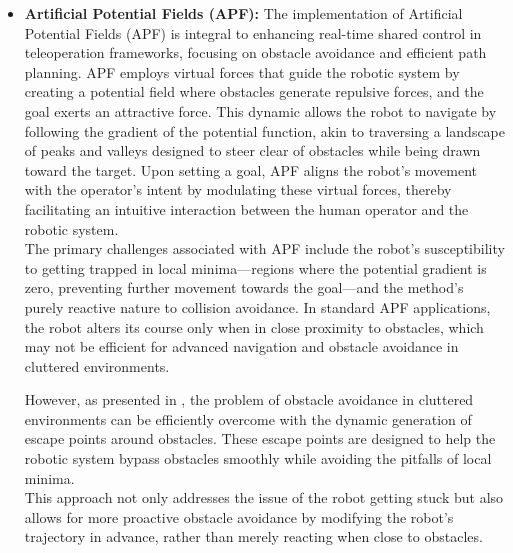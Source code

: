 \begin{itemize}
    \item\textbf{Artificial Potential Fields (APF):} 
    The implementation of Artificial Potential Fields (APF) \cite{100007} is integral to enhancing real-time shared control in teleoperation frameworks, focusing on obstacle avoidance and efficient path planning. 
    APF employs virtual forces that guide the robotic system by creating a potential field where obstacles generate repulsive forces, and the goal exerts an attractive force. This dynamic allows the robot to navigate by following the gradient of the potential function, akin to traversing a landscape of peaks and valleys designed to steer clear of obstacles while being drawn toward the target.
    Upon setting a goal, APF aligns the robot's movement with the operator's intent by modulating these virtual forces, thereby facilitating an intuitive interaction between the human operator and the robotic system.\\
    The primary challenges associated with APF include the robot's susceptibility to getting trapped in local minima—regions where the potential gradient is zero, preventing further movement towards the goal—and the method's purely reactive nature to collision avoidance. 
    In standard APF applications, the robot alters its course only when in close proximity to obstacles, which may not be efficient for advanced navigation and obstacle avoidance in cluttered environments. 

    However, as presented in \cite{9734752}, the problem of obstacle avoidance in cluttered environments can be efficiently overcome with the dynamic generation of escape points around obstacles. 
    These escape points are designed to help the robotic system bypass obstacles smoothly while avoiding the pitfalls of local minima.\\ 
    This approach not only addresses the issue of the robot getting stuck but also allows for more proactive obstacle avoidance by modifying the robot's trajectory in advance, rather than merely reacting when close to obstacles.


\end{itemize}
